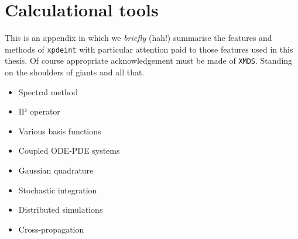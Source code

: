 \chapter{Calculational tools}
\label{ToolsAppendix}
\graphicspath{{Figures/ToolsAppendix/}{Figures/Common/}}

This is an appendix in which we \emph{briefly} (hah!) summarise the features and methods of \texttt{xpdeint} with particular attention paid to those features used in this thesis. Of course appropriate acknowledgement must be made of \texttt{XMDS}. Standing on the shoulders of giants and all that.

\begin{itemize}
    \item Spectral method
    \item IP operator
    \item Various basis functions
    \item Coupled ODE-PDE systems
    \item Gaussian quadrature
    \item Stochastic integration
    \item Distributed simulations
    \item Cross-propagation
\end{itemize}